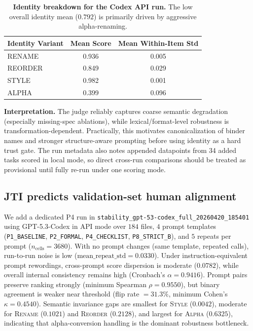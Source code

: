 \documentclass{article}
\begin{document}
\begin{table}[t]
  \centering
  \small
  \begin{tabular}{lcc}
    \toprule
    \textbf{Identity Variant} & \textbf{Mean Score} & \textbf{Mean Within-Item Std} \\
    \midrule
    RENAME                    & 0.936               & 0.005                         \\
    REORDER                   & 0.849               & 0.029                         \\
    STYLE                     & 0.982               & 0.001                         \\
    ALPHA                     & 0.399               & 0.096                         \\
    \bottomrule
  \end{tabular}
  \caption{\textbf{Identity breakdown for the Codex API run.} The low overall identity mean (\(0.792\)) is primarily driven by aggressive alpha-renaming.}
  \label{tab:codex_identity_variants}
\end{table}

\textbf{Interpretation.}
The judge reliably captures coarse semantic degradation (especially missing-spec ablations), while lexical/format-level robustness is transformation-dependent.
Practically, this motivates canonicalization of binder names and stronger structure-aware prompting before using identity as a hard trust gate.
The run metadata also notes appended datapoints from 34 added tasks scored in local mode, so direct cross-run comparisons should be treated as provisional until fully re-run under one scoring mode.

\subsection{JTI predicts validation-set human alignment}
We add a dedicated P4 run in \texttt{stability\_gpt-53-codex\_full\_20260420\_185401} using GPT-5.3-Codex in API mode over \(184\) files, \(4\) prompt templates (\texttt{P1\_BASELINE}, \texttt{P2\_FORMAL}, \texttt{P4\_CHECKLIST}, \texttt{P8\_STRICT\_B}), and \(5\) repeats per prompt (\(n_\text{cells}=3680\)).
With no prompt changes (same template, repeated calls), run-to-run noise is low (\(\text{mean\_repeat\_std}=0.0330\)).
Under instruction-equivalent prompt rewordings, cross-prompt score dispersion is moderate (\(0.0782\)), while overall internal consistency remains high (Cronbach's \(\alpha=0.9416\)).
Prompt pairs preserve ranking strongly (minimum Spearman \(\rho=0.9550\)), but binary agreement is weaker near threshold (flip rate \(=31.3\%\), minimum Cohen's \(\kappa=0.4540\)).
Semantic invariance gaps are smallest for \textsc{Style} (\(0.0042\)), moderate for \textsc{Rename} (\(0.1021\)) and \textsc{Reorder} (\(0.2128\)), and largest for \textsc{Alpha} (\(0.6325\)), indicating that alpha-conversion handling is the dominant robustness bottleneck.
\end{document}

